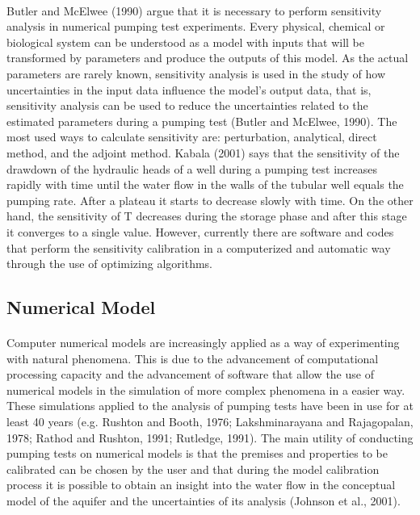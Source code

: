 \documentclass[11pt, a4paper]{article}
\begin{document}
    \paragraph{} %
    Butler and McElwee (1990) argue that it is necessary to perform sensitivity analysis in numerical pumping test experiments. Every physical, chemical or biological system can be understood as a model with inputs that will be transformed by parameters and produce the outputs of this model. As the actual parameters are rarely known, sensitivity analysis is used in the study of how uncertainties in the input data influence the model's output data, that is, sensitivity analysis can be used to reduce the uncertainties related to the estimated parameters during a pumping test (Butler and McElwee, 1990). The most used ways to calculate sensitivity are: perturbation, analytical, direct method, and the adjoint method. Kabala (2001) says that the sensitivity of the drawdown of the hydraulic heads of a well during a pumping test increases rapidly with time until the water flow in the walls of the tubular well equals the pumping rate. After a plateau it starts to decrease slowly with time. On the other hand, the sensitivity of T decreases during the storage phase and after this stage it converges to a single value. However, currently there are software and codes that perform the sensitivity calibration in a computerized and automatic way through the use of optimizing algorithms.
    
    \subsection{Numerical Model}
    \paragraph{} %
    Computer numerical models are increasingly applied as a way of experimenting with natural phenomena. This is due to the advancement of computational processing capacity and the advancement of software that allow the use of numerical models in the simulation of more complex phenomena in a easier way. These simulations applied to the analysis of pumping tests have been in use for at least 40 years (e.g. Rushton and Booth, 1976; Lakshminarayana and Rajagopalan, 1978; Rathod and Rushton, 1991; Rutledge, 1991). The main utility of conducting pumping tests on numerical models is that the premises and properties to be calibrated can be chosen by the user and that during the model calibration process it is possible to obtain an insight into the water flow in the conceptual model of the aquifer and the uncertainties of its analysis (Johnson et al., 2001).
\end{document}
